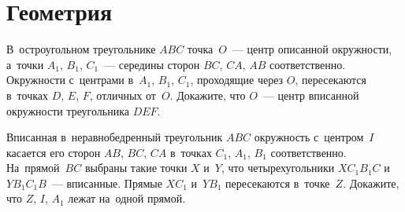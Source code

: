 \section*{Геометрия}



\begingroup\providecommand\ifincludesolutions{\iffalse}

\ifincludesolutions
\subsection*{Версия с решениями}
\fi

\begin{problems}

\item
В~остроугольном треугольнике $ABC$ точка~$O$~--- центр описанной окружности,
а~точки $A_1$, $B_1$, $C_1$~--- середины сторон $BC$, $CA$, $AB$
соответственно.
Окружности с~центрами в~$A_1$, $B_1$, $C_1$, проходящие через $O$, пересекаются
в~точках $D$, $E$, $F$, отличных от~$O$.
Докажите, что $O$~--- центр вписанной окружности треугольника $DEF$.

\end{problems}

\ifincludesolutions
Пусть $D$~--- отличная от~$O$ точка пересечения окружностей $\omega_B$
и~$\omega_C$ с~центрами $B_1$ и~$C_1$ из~условия;
$E$~--- $\omega_C$ и~$\omega_B$; аналогично $F$.
Достаточно показать, что $DO$~--- биссектриса угла $EDF$
(прямые $EO$ и~$FO$ также будут биссектрисами своих углов и~$O$ будет точкой
пересечения биссектрис).
Заметим, что $\angle EDO = \frac{1}{2} \angle E C_1 O = \angle O C_1 B_1$.
Первое равенство~--- соотношение вписанного и~центрального углов окружности
$\omega_C$, второе вытекает из~равенства треугольников
$E C_1 B_1$ и~$O C_1 B_1$.
Аналогично $\angle FDO = \frac{1}{2} \angle F A_1 O = \angle O A_1 B_1$.
Общеизвестно, что центр~$O$ описанной окружности треугольника $ABC$ является
также точкой пересечения высот треугольника $A_1B_1C_1$, а~значит $\angle
OC_1B_1 = 90^{\circ} - \angle C_1 B_1 A_1 = \angle O A_1 B_1$.
Из~выписанных равенств следует, что $\angle EDO = \angle FDO$ и~что прямая~$DO$
действительно является биссектрисой угла $EDF$.
\fi %

\begin{problems}

\item
Вписанная в~неравнобедренный треугольник $ABC$ окружность с~центром~$I$
касается его сторон $AB$, $BC$, $CA$ в~точках $C_1$, $A_1$, $B_1$
соответственно.
На~прямой~$BC$ выбраны такие точки $X$ и~$Y$, что четырехугольники
$X C_1 B_1C$ и $Y B_1 C_1B$~--- вписанные.
Прямые $X C_1$ и~$Y B_1$ пересекаются в~точке~$Z$.
Докажите, что $Z$, $I$, $A_1$ лежат на~одной прямой.

\end{problems}

